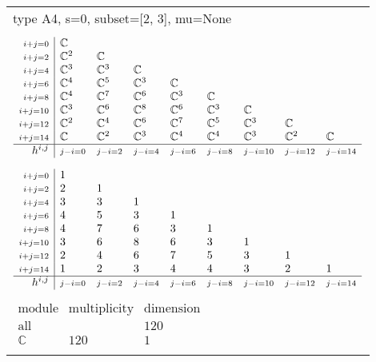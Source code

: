 \documentclass[crop,border=2mm]{standalone}
\begin{document}
\begin{tabular}{l}
{\huge type A4, s=0, subset=[2, 3], mu=None}\\ \\


$\displaystyle
\begin{array}{r|l l l l l l l l}
	{\scriptstyle i+j=0}&\mathbb{C}&&&&&&&\\
	{\scriptstyle i+j=2}&\mathbb{C}^{2}&\mathbb{C}&&&&&&\\
	{\scriptstyle i+j=4}&\mathbb{C}^{3}&\mathbb{C}^{3}&\mathbb{C}&&&&&\\
	{\scriptstyle i+j=6}&\mathbb{C}^{4}&\mathbb{C}^{5}&\mathbb{C}^{3}&\mathbb{C}&&&&\\
	{\scriptstyle i+j=8}&\mathbb{C}^{4}&\mathbb{C}^{7}&\mathbb{C}^{6}&\mathbb{C}^{3}&\mathbb{C}&&&\\
	{\scriptstyle i+j=10}&\mathbb{C}^{3}&\mathbb{C}^{6}&\mathbb{C}^{8}&\mathbb{C}^{6}&\mathbb{C}^{3}&\mathbb{C}&&\\
	{\scriptstyle i+j=12}&\mathbb{C}^{2}&\mathbb{C}^{4}&\mathbb{C}^{6}&\mathbb{C}^{7}&\mathbb{C}^{5}&\mathbb{C}^{3}&\mathbb{C}&\\
	{\scriptstyle i+j=14}&\mathbb{C}&\mathbb{C}^{2}&\mathbb{C}^{3}&\mathbb{C}^{4}&\mathbb{C}^{4}&\mathbb{C}^{3}&\mathbb{C}^{2}&\mathbb{C}\\
	\hline h^{i,j}&{\scriptstyle j-i=0}&{\scriptstyle j-i=2}&{\scriptstyle j-i=4}&{\scriptstyle j-i=6}&{\scriptstyle j-i=8}&{\scriptstyle j-i=10}&{\scriptstyle j-i=12}&{\scriptstyle j-i=14}
\end{array}
$ \\ \\


$\displaystyle
\begin{array}{r|l l l l l l l l}
	{\scriptstyle i+j=0}&1&&&&&&&\\
	{\scriptstyle i+j=2}&2&1&&&&&&\\
	{\scriptstyle i+j=4}&3&3&1&&&&&\\
	{\scriptstyle i+j=6}&4&5&3&1&&&&\\
	{\scriptstyle i+j=8}&4&7&6&3&1&&&\\
	{\scriptstyle i+j=10}&3&6&8&6&3&1&&\\
	{\scriptstyle i+j=12}&2&4&6&7&5&3&1&\\
	{\scriptstyle i+j=14}&1&2&3&4&4&3&2&1\\
	\hline h^{i,j}&{\scriptstyle j-i=0}&{\scriptstyle j-i=2}&{\scriptstyle j-i=4}&{\scriptstyle j-i=6}&{\scriptstyle j-i=8}&{\scriptstyle j-i=10}&{\scriptstyle j-i=12}&{\scriptstyle j-i=14}
\end{array}
$ \\ \\


$\displaystyle
\begin{array}{rll}
	\text{module}&\text{multiplicity}&\text{dimension} \\ \hline \text{all}&&120 \\
	\mathbb{C}&120&1
\end{array}
$ \\ \\

\end{tabular}
\end{document}
